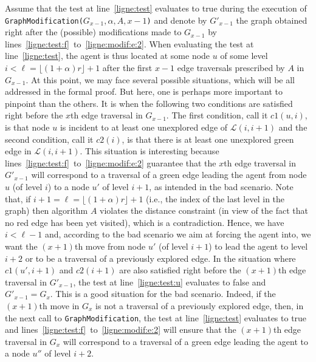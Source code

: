 \documentclass[11pt]{article}
\begin{document}
{Assume that the test at line~\ref{ligne:test} evaluates to true during the execution of {\tt GraphModification($G_{x-1},\alpha,A,x-1$)} and denote by $G'_{x-1}$ the graph obtained right after the (possible) modifications made to $G_{x-1}$ by lines~\ref{ligne:test:f}~to~\ref{ligne:modif:e:2}. When evaluating the test at line~\ref{ligne:test}, the agent is thus located at some node $u$ of some level $i<\ell=\lfloor(1+\alpha)r\rfloor+1$ after the first $x-1$ edge traversals prescribed by $A$ in $G_{x-1}$. At this point, we may face several possible situations, which will be all addressed in the formal proof. But here, one is perhaps more important to pinpoint than the others. It is when the following two conditions are satisfied right before the $x$th edge traversal in $G_{x-1}$. The first condition, call it {$c1(u,i)$}, is that node $u$ is incident to at least one unexplored edge of $\mathcal{L}(i,i+1)$ and the second condition, call it {$c2(i)$}, is that there is at least one unexplored green edge in $\mathcal{L}(i,i+1)$. This situation is interesting because lines~\ref{ligne:test:f}~to~\ref{ligne:modif:e:2} guarantee that the $x$th edge traversal in $G'_{x-1}$ will correspond to a traversal of a green edge leading the agent from node $u$ (of level $i$) to a node $u'$ of level $i+1$, as intended in the bad scenario. Note that, if $i+1=\ell=\lfloor(1+\alpha)r\rfloor+1$ (i.e., the index of the last level in the graph) then algorithm $A$ violates the distance constraint (in view of the fact that no red edge has been yet visited), which is a contradiction. Hence, we have $i<\ell-1$ and, according to the bad scenario we aim at forcing the agent into, we want the $(x+1)$th move from node $u'$ (of level $i+1$) to lead the agent to level $i+2$ or to be a traversal of a previously explored edge. In the situation where $c1(u',i+1)$ and $c2(i+1)$ are also satisfied right before the $(x+1)$th edge traversal in $G'_{x-1}$, the test at line~\ref{ligne:test:u} evaluates to false and $G'_{x-1}=G_x$. This is a good situation for the bad scenario. Indeed, if the $(x+1)$th move in $G_x$ is not a traversal of a previously explored edge, then, in the next call to {\tt GraphModification}, the test at line~\ref{ligne:test} evaluates to true and lines~\ref{ligne:test:f}~to~\ref{ligne:modif:e:2} will ensure that the $(x+1)$th edge traversal in $G_x$ will correspond to a traversal of a green edge leading the agent to a node $u''$ of level $i+2$.

}
\end{document}
